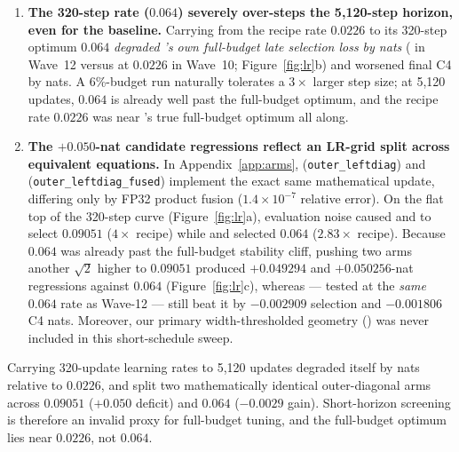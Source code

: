\begin{enumerate}
\item \textbf{The 320-step rate ($0.064$) severely over-steps the 5{,}120-step
  horizon, even for the baseline.} Carrying  from the recipe rate
  $0.0226$ to its 320-step optimum $0.064$ \emph{degraded 's own
  full-budget late selection loss by \waveTwelveMuontSelDiff{} nats}
  (\cselWaveOneTwoMuont{} in Wave~12 versus \cselWaveOneZeroMuont{} at $0.0226$
  in Wave~10; Figure~\ref{fig:lr}b) and worsened final C4 by
  \waveTwelveMuontCfourDiff{} nats. A 6\%-budget run naturally tolerates a
  $3\times$ larger step size; at 5{,}120 updates, $0.064$ is already well past
  the full-budget optimum, and the recipe rate $0.0226$ was near
  's true full-budget optimum all along.
\item \textbf{The $+0.050$-nat candidate regressions reflect an LR-grid split across
  equivalent equations.} In Appendix~\ref{app:arms}, 
  (\texttt{outer\_\allowbreak leftdiag}) and 
  (\texttt{outer\_\allowbreak leftdiag\_\allowbreak fused}) implement the exact
  same mathematical update, differing only by FP32 product fusion
  ($1.4\times 10^{-7}$ relative error). On the flat top of the 320-step curve
  (Figure~\ref{fig:lr}a), evaluation noise caused  and
   to select $0.09051$ ($4\times$ recipe) while
   and  selected $0.064$ ($2.83\times$ recipe).
  Because $0.064$ was already past the full-budget stability cliff, pushing two
  arms another $\sqrt{2}$ higher to $0.09051$ produced $+0.049294$ and
  $+0.050256$-nat regressions against $0.064$ (Figure~\ref{fig:lr}c), whereas
   --- tested at the \emph{same} $0.064$ rate as Wave-12
   --- still beat it by $-0.002909$ selection and $-0.001806$ C4
  nats. Moreover, our primary width-thresholded geometry 
  (\mlpdiag{}) was never included in this short-schedule sweep.
\end{enumerate}

\begin{finding}
Carrying 320-update learning rates to 5{,}120 updates degraded \muont{} itself
by \waveTwelveMuontSelDiffMag{} nats relative to $0.0226$, and split two
mathematically identical outer-diagonal arms across $0.09051$ ($+0.050$ deficit)
and $0.064$ ($-0.0029$ gain). Short-horizon screening is therefore an invalid
proxy for full-budget tuning, and the full-budget optimum lies near $0.0226$,
not $0.064$.
\end{finding}

